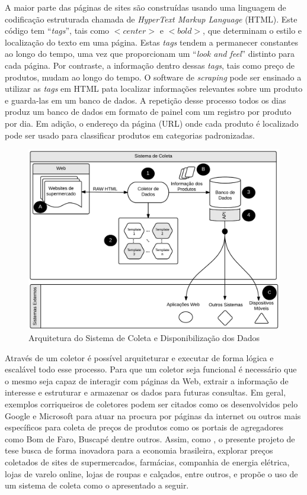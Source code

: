 \documentclass[twoside,a4paper,11pt]{report}
\begin{document}
A maior parte das páginas de sites são construídas usando uma linguagem de codificação estruturada chamada de \emph{HyperText Markup Language} (HTML). Este código tem “\emph{tags}”, tais como $<center>$ e $<bold>$, que determinam o estilo e localização do texto em uma página. Estas \emph{tags} tendem a permanecer constantes ao longo do tempo, uma vez que proporcionam um “\emph{look and feel}” distinto para cada página. Por contraste, a informação dentro dessas \emph{tags}, tais como preço de produtos, mudam ao longo do tempo. O software de \emph{scraping} pode ser ensinado a utilizar as \emph{tags} em HTML pata localizar informações relevantes sobre um produto e guarda-las em um banco de dados. A repetição desse processo todos os dias produz um banco de dados em formato de painel com um registro por produto por dia. Em adição, o endereço da página (URL) onde cada produto é localizado pode ser usado para classificar produtos em categorias padronizadas. 

\begin{figure}[htbp]
  \centering
  \includegraphics[width=\textwidth]{WebScraping}
  \caption[Figura Simples]{Arquitetura do Sistema de Coleta e Disponibilização dos Dados}
  \label{fig:01}
\end{figure}

Através de um coletor é possível arquiteturar e executar de forma lógica e escalável todo esse processo. Para que um coletor seja funcional é necessário que o mesmo seja capaz de interagir com páginas da Web, extrair a informação de interesse e estruturar e armazenar os dados para futuras consultas. Em geral, exemplos corriqueiros de coletores podem ser citados como os desenvolvidos pelo Google e Microsoft para atuar na procura por páginas da internet ou outros mais específicos para coleta de preços de produtos como os portais de agregadores como Bom de Faro, Buscapé dentre outros. Assim, como \citet{cavallo2010scraped}, o presente projeto de tese busca de forma inovadora para a economia brasileira, explorar preços coletados de sites de supermercados, farmácias, companhia de energia elétrica, lojas de varelo online, lojas de roupas e calçados, entre outros, e propõe o uso de um sistema de coleta como o apresentado a seguir. 
\end{document}
